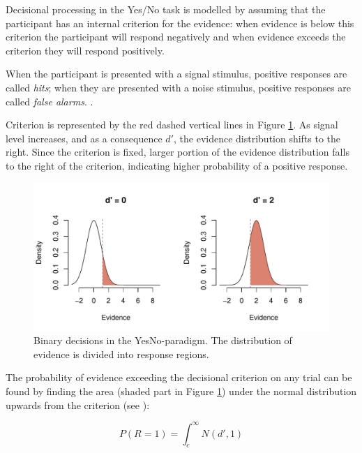 \documentclass{article}\usepackage{knitr}
\begin{document}
Decisional processing in the Yes/No task is modelled by assuming that the participant has an internal criterion for the evidence: when evidence is below this criterion the participant will respond negatively and when evidence exceeds the criterion they will respond  positively.

When the participant is presented with a signal stimulus, positive responses are called \textit{hits}; when they  are presented with a noise stimulus, positive responses are called \textit{false alarms}. \citep{wickens2002, kingdomprins2010}. 

Criterion is represented by the red dashed vertical lines in Figure \ref{fig:yesno}. As signal level increases, and as a consequence $d'$, the evidence distribution shifts to the right. Since the criterion is fixed, larger portion of the evidence distribution falls to the right of the criterion, indicating higher probability of a positive response.

\begin{figure}[!htb]
\centering
\begin{knitrout}
\color{fgcolor}
\includegraphics[width=\maxwidth]{figure/unnamed-chunk-4-1} 

\end{knitrout}
\caption{Binary decisions in the YesNo-paradigm. The distribution of evidence is divided into response regions.}
\label{fig:yesno}
\end{figure}

The probability of evidence exceeding the decisional criterion on any trial can be found by finding the area (shaded part in Figure \ref{fig:yesno}) under the normal distribution upwards from the criterion (see \citet{wickens2002, kingdomprins2010}):

\begin{equation}
\label{eq:SDTintegral}
P(R = 1) = \int_{c}^{\infty} N(d', 1)
\end{equation}
\end{document}
